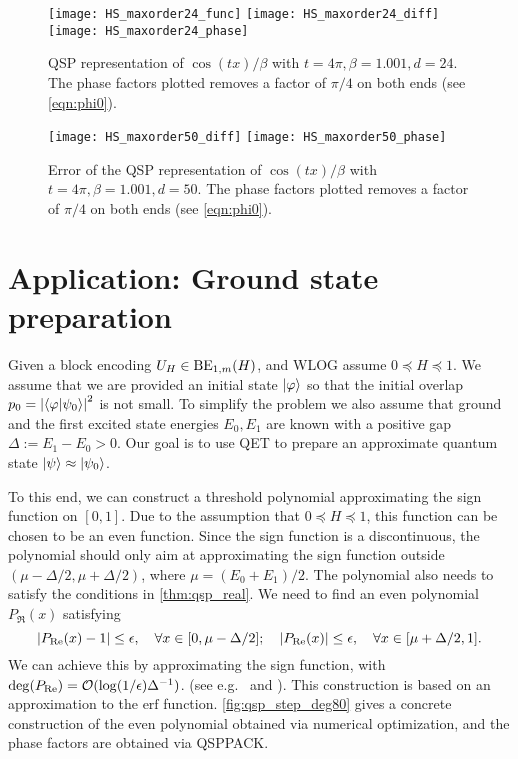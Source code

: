 \begin{figure}[H]
\begin{center}
\texttt{[image: HS\_maxorder24\_func]}
\texttt{[image: HS\_maxorder24\_diff]}
\texttt{[image: HS\_maxorder24\_phase]}
\end{center}
\caption{QSP representation of $\cos(tx)/\beta$ with $t=4\pi,\beta=1.001,d=24$. The phase factors plotted removes a factor of $\pi/4$ on both ends (see \cref{eqn:phi0}).}
\label{fig:qsp_HS_maxorder24}
\end{figure}

\begin{figure}[H]
\begin{center}
\texttt{[image: HS\_maxorder50\_diff]}
\texttt{[image: HS\_maxorder50\_phase]}
\end{center}
\caption{Error of the QSP representation of $\cos(tx)/\beta$ with $t=4\pi,\beta=1.001,d=50$. The phase factors plotted removes a factor of $\pi/4$ on both ends  (see \cref{eqn:phi0}).}
\label{fig:qsp_HS_maxorder50}
\end{figure}


\section{Application: Ground state preparation}\label{sec:qsp_groundstate}
%
Given a block encoding $U_H\in\operatorname{BE}_{1,m}(H)$, and WLOG assume $0\preceq H\preceq 1$. We assume that we are provided an initial state $\ket{\varphi}$ so that the initial overlap $p_0=\left\lvert\braket{\varphi|\psi_0}\right\rvert^2$ is not small.
To simplify the problem we also assume that ground and the first excited state energies $E_0,E_1$ are known with a positive gap $\Delta:=E_1-E_0>0$. 
Our goal is to use QET to prepare an approximate quantum state $\ket{\psi}\approx \ket{\psi_0}$.

To this end, we can construct a threshold polynomial approximating the sign function on $[0,1]$. 
Due to the assumption that $0\preceq H\preceq 1$, this function can be chosen to be an even function. 
Since the sign function is a discontinuous, the polynomial should only aim at approximating the sign function outside $(\mu-\Delta/2,\mu+\Delta/2)$, where $\mu=(E_0+E_1)/2$. 
The polynomial also needs to satisfy the conditions in \cref{thm:qsp_real}.
We need to find an even polynomial $P_{\Re}(x)$ satisfying
\begin{equation}
\left\lvert P_{\operatorname{Re}}(x)-1\right\rvert\le \epsilon, \quad \forall x\in [0,\mu-\Delta/2]; \quad \left\lvert P_{\operatorname{Re}}(x)\right\rvert\le \epsilon, \quad \forall x\in [\mu+\Delta/2,1].
\end{equation}
We can achieve this by approximating the sign function, with $\deg(P_{\operatorname{Re}})=\mathcal{O}(\log(1/\epsilon) \Delta^{-1})$. (see e.g.~\cite[Corollary 7]{LowChuang2017a} and \cite[Corollary 16]{GilyenSuLowEtAl2019}). 
This construction is based on an approximation to the $\mathrm{erf}$ function.
\cref{fig:qsp_step_deg80} gives a concrete construction of the even polynomial obtained via numerical optimization, and the phase factors are obtained via QSPPACK.


